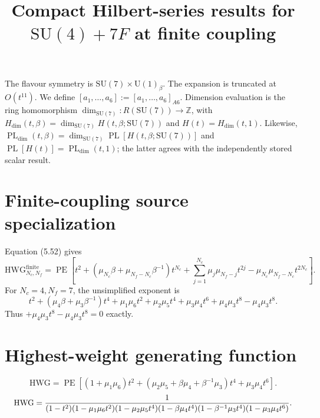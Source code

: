 \documentclass[10pt]{article}
\title{Compact Hilbert-series results for $\mathrm{SU(4)}+7F$ at finite coupling}
\date{}
\newcommand{\PE}{\operatorname{PE}}
\begin{document}
\maketitle
The flavour symmetry is $\mathrm{SU}(7)\times\mathrm{U}(1)_{\beta}$.
The expansion is truncated at $O(t^{11})$.  We define
$[a_1,\ldots,a_{6}]:=[a_1,\ldots,a_{6}]_{A6}$.
Dimension evaluation is the ring homomorphism
$\dim_{\mathrm{SU}(7)}:R(\mathrm{SU}(7))\to\mathbb{Z}$, with
$H_{\mathrm{dim}}(t,\beta)=\dim_{\mathrm{SU}(7)}H(t,\beta;\mathrm{SU}(7))$
and $H(t)=H_{\mathrm{dim}}(t,1)$. Likewise,
$\operatorname{PL}_{\mathrm{dim}}(t,\beta)=\dim_{\mathrm{SU}(7)}
\operatorname{PL}[H(t,\beta;\mathrm{SU}(7))]$ and
$\operatorname{PL}[H(t)]=\operatorname{PL}_{\mathrm{dim}}(t,1)$;
the latter agrees with the independently stored scalar result.
\section{Finite-coupling source specialization}
Equation (5.52) gives
\[\mathrm{HWG}^{\mathrm{finite}}_{N_c,N_f}=\PE\!\left[t^2+(\mu_{N_c}\beta+\mu_{N_f-N_c}\beta^{-1})t^{N_c}+\sum_{j=1}^{N_c}\mu_j\mu_{N_f-j}t^{2j}-\mu_{N_c}\mu_{N_f-N_c}t^{2N_c}\right].\]
For $N_c=4,N_f=7$, the unsimplified exponent is
\[t^2+(\mu_4\beta+\mu_3\beta^{-1})t^4+\mu_1\mu_6t^2+\mu_2\mu_5t^4+\mu_3\mu_4t^6+\mu_4\mu_3t^8-\mu_4\mu_3t^8.\]
Thus $+\mu_4\mu_3t^8-\mu_4\mu_3t^8=0$ exactly.


\section{Highest-weight generating function}
\begin{equation}
\mathrm{HWG}=\PE\!\left[(1+\mu_1\mu_6)t^2
+(\mu_2\mu_5+\beta\mu_4+\beta^{-1}\mu_3)t^4
+\mu_3\mu_4t^6\right].
\end{equation}
\begin{equation}
\resizebox{0.98\linewidth}{!}{${\displaystyle
\mathrm{HWG}=\frac{1}{(1-t^2)(1-\mu_1\mu_6t^2)(1-\mu_2\mu_5t^4)
(1-\beta\mu_4t^4)(1-\beta^{-1}\mu_3t^4)(1-\mu_3\mu_4t^6)}.}$}
\end{equation}
\end{document}
